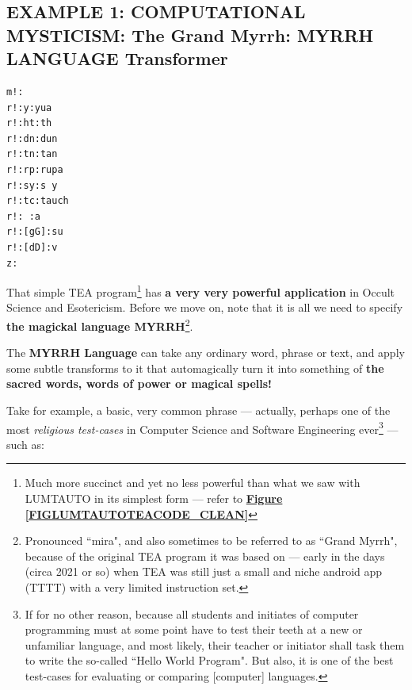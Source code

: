 \documentclass[a4paper, 18pt]{book} %
\begin{document}
\subsection{EXAMPLE 1: \textbf{COMPUTATIONAL MYSTICISM:} The Grand Myrrh: \textbf{MYRRH LANGUAGE} Transformer}
\label{SECEXAMP1M}


{
\Large

  \begin{tcolorbox}[teaterminalstyle, title=TEA Program: The Grand Myrrh Transform, breakable]
  \begin{lstlisting}[language=TEA,breaklines=true]
m!:
r!:y:yua
r!:ht:th
r!:dn:dun
r!:tn:tan
r!:rp:rupa
r!:sy:s y
r!:tc:tauch
r!: :a 
r!:[gG]:su
r!:[dD]:v
z:
   \end{lstlisting}
  \end{tcolorbox}
  \label{FIGTEAMYRRH}

}

\vspace{2em}


That simple TEA program\footnote{Much more succinct and yet no less powerful than what we saw with LUMTAUTO in its simplest form --- refer to \textbf{\hyperref[FIGLUMTAUTOTEACODE_CLEAN]{Figure \ref{FIGLUMTAUTOTEACODE_CLEAN}}}} has \textbf{a very very powerful application} in Occult Science and Esotericism. Before we move on, note that it is all we need to specify \textbf{the magickal language MYRRH}\footnote{Pronounced ``mira", and also sometimes to be referred to as ``Grand Myrrh", because of the original TEA program it was based on --- early in the days (circa 2021 or so) when TEA was still just a small and niche android app (TTTT) with a very limited instruction set\cite{lutalo2024tea}.}. 

\vspace{2em}

The \textbf{MYRRH Language} can take any ordinary word, phrase or text, and apply some subtle transforms to it that automagically turn it into something of \textbf{the sacred words, words of power or magical spells!}


\vspace{2em}


Take for example, a basic, very common phrase --- actually, perhaps one of the most \textit{religious test-cases} in Computer Science and Software Engineering ever\footnote{If for no other reason, because all students and initiates of computer programming must at some point have to test their teeth at a new or unfamiliar language, and most likely, their teacher or initiator shall task them to write the so-called ``Hello World Program". But also, it is one of the best test-cases for evaluating or comparing [computer] languages\cite{lutalo2023dnapsoe}.} --- such as: 
\end{document}
